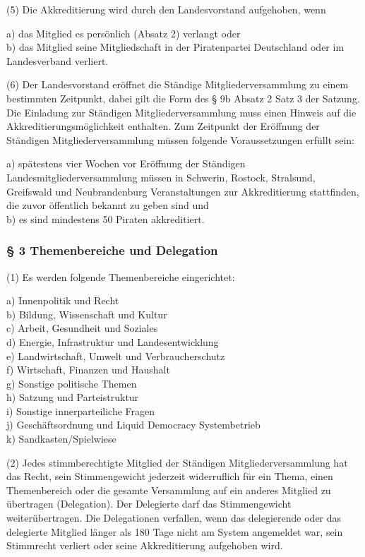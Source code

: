 (5) Die Akkreditierung wird durch den Landesvorstand aufgehoben, wenn

a) das Mitglied es persönlich (Absatz 2) verlangt oder\\b) das Mitglied seine Mitgliedschaft in der Piratenpartei Deutschland oder im Landesverband verliert.

(6) Der Landesvorstand eröffnet die Ständige Mitgliederversammlung zu einem bestimmten Zeitpunkt, dabei gilt die Form des § 9b Absatz 2 Satz 3 der Satzung. Die Einladung zur Ständigen Mitgliederversammlung muss einen Hinweis auf die Akkreditierungsmöglichkeit enthalten. Zum Zeitpunkt der Eröffnung der Ständigen Mitgliederversammlung müssen folgende Voraussetzungen erfüllt sein:

a) spätestens vier Wochen vor Eröffnung der Ständigen Landesmitgliederversammlung müssen in Schwerin, Rostock, Stralsund, Greifswald und Neubrandenburg Veranstaltungen zur Akkreditierung stattfinden, die zuvor öffentlich bekannt zu geben sind und\\b) es sind mindestens 50 Piraten akkreditiert.

\subsubsection{§ 3 Themenbereiche und Delegation}

(1) Es werden folgende Themenbereiche eingerichtet:

a) Innenpolitik und Recht\\b) Bildung, Wissenschaft und Kultur\\c) Arbeit, Gesundheit und Soziales\\d) Energie, Infrastruktur und Landesentwicklung\\e) Landwirtschaft, Umwelt und Verbraucherschutz\\f) Wirtschaft, Finanzen und Haushalt\\g) Sonstige politische Themen\\h) Satzung und Parteistruktur\\i) Sonstige innerparteiliche Fragen\\j) Geschäftsordnung und Liquid Democracy Systembetrieb\\k) Sandkasten/Spielwiese

(2) Jedes stimmberechtigte Mitglied der Ständigen Mitgliederversammlung hat das Recht, sein Stimmengewicht jederzeit widerruflich für ein Thema, einen Themenbereich oder die gesamte Versammlung auf ein anderes Mitglied zu übertragen (Delegation). Der Delegierte darf das Stimmengewicht weiterübertragen. Die Delegationen verfallen, wenn das delegierende oder das delegierte Mitglied länger als 180 Tage nicht am System angemeldet war, sein Stimmrecht verliert oder seine Akkreditierung aufgehoben wird.

